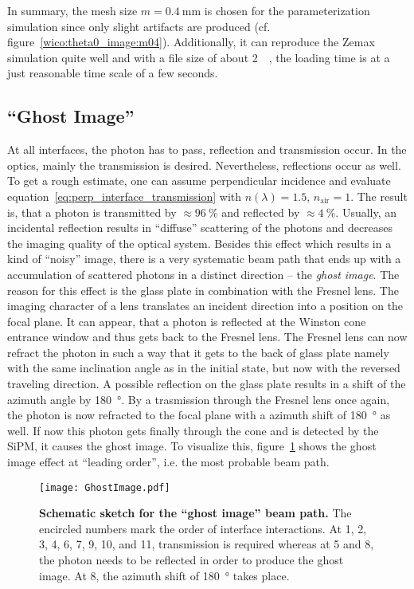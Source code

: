 In summary, the mesh size $m=\SI{0.4}{\milli\meter}$ is chosen for the parameterization simulation since only slight artifacts are produced (cf. figure~\ref{wico:theta0_image:m04}). Additionally, it can reproduce the Zemax simulation quite well and with a file size of about \SI{2}{\mebi\byte}, the loading time is at a just reasonable time scale of a few seconds.

\subsection{\enquote{Ghost Image}}\label{sec:ghost_image}

At all interfaces, the photon has to pass, reflection and transmission occur. In the \iceact optics, mainly the transmission is desired. Nevertheless, reflections occur as well. To get a rough estimate, one can assume perpendicular incidence and evaluate equation~\eqref{eq:perp_interface_transmission} with $n(\lambda)=\num{1.5}$, $n_\text{air}=1$. The result is, that a photon is transmitted by $\approx\SI{96}{\percent}$ and reflected by $\approx\SI{4}{\percent}$. Usually, an incidental reflection results in \enquote{diffuse} scattering of the photons and decreases the imaging quality of the optical system. Besides this effect which results in a kind of \enquote{noisy} image, there is a very systematic beam path that ends up with a accumulation of scattered photons in a distinct direction -- the \textit{ghost image}. The reason for this effect is the glass plate in combination with the Fresnel lens. The imaging character of a lens translates an incident direction into a position on the focal plane. It can appear, that a photon is reflected at the Winston cone entrance window and thus gets back to the Fresnel lens. The Fresnel lens can now refract the photon in such a way that it gets to the back of glass plate namely with the same inclination angle as in the initial state, but now with the reversed traveling direction. A possible reflection on the glass plate results in a shift of the azimuth angle by \SI{180}{\degree}. By a trasmission through the Fresnel lens once again, the photon is now refracted to the focal plane with a azimuth shift of \SI{180}{\degree} as well. If now this photon gets finally through the cone and is detected by the SiPM, it causes the ghost image. To visualize this, figure~\ref{ghostimage_path} shows the ghost image effect at \enquote{leading order}, i.e. the most probable beam path.\\

\begin{figure}[H]
	\centering
	\texttt{[image: GhostImage.pdf]}
	\caption[Schematic sketch for the \enquote{ghost image} beam path]{\textbf{Schematic sketch for the \enquote{ghost image} beam path.} The encircled numbers mark the order of interface interactions. At 1, 2, 3, 4, 6, 7, 9, 10, and 11, transmission is required whereas at 5 and 8, the photon needs to be reflected in order to produce the ghost image. At 8, the azimuth shift of \SI{180}{\degree} takes place.}
	\label{ghostimage_path}
\end{figure}

